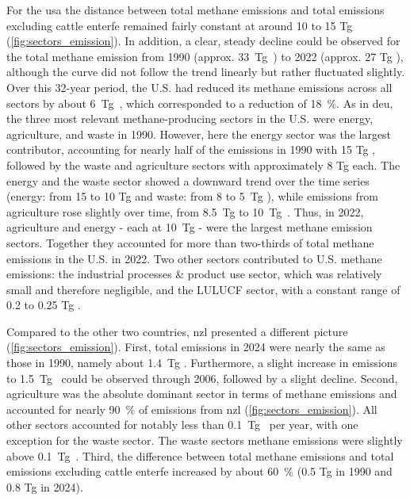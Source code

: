 For the \acrshort{usa} the distance between total methane emissions and total emissions excluding cattle \acrshort{enterfe} remained fairly constant at around 10 to 15 Tg  (\cref{fig:sectors_emission}).
In addition, a clear, steady decline could be observed for the total methane emission from 1990 (approx. 33~Tg~) to 2022 (approx. 27 Tg ), although the curve did not follow the trend linearly but rather fluctuated slightly. Over this 32-year period, the U.S. had reduced its methane emissions across all sectors by about 6~Tg~, which corresponded to a reduction of 18~\%.
As in \acrshort{deu}, the three most relevant methane-producing sectors in the U.S. were energy, agriculture, and waste in 1990. However, here the energy sector was the largest contributor, accounting for nearly half of the emissions in 1990 with 15 Tg , followed by the waste and agriculture sectors with approximately 8 Tg  each.
The energy and the waste sector showed a downward trend over the time series (energy: from 15 to 10 Tg  and waste: from 8 to 5~Tg ), while emissions from agriculture rose slightly over time, from 8.5~Tg to 10~Tg~. Thus, in 2022, agriculture and energy - each at 10~Tg  - were the largest methane emission sectors. Together they accounted for more than two-thirds of total methane emissions in the U.S. in 2022.
Two other sectors contributed to U.S. methane emissions: the industrial processes \& product use sector, which was relatively small and therefore negligible, and the LULUCF sector, with a constant range of 0.2 to 0.25 Tg .

Compared to the other two countries, \acrshort{nzl} presented a different picture (\cref{fig:sectors_emission}).
First, total  emissions in 2024 were nearly the same as those in 1990, namely about 1.4~Tg . Furthermore, a slight increase in emissions to 1.5~Tg~ could be observed through 2006, followed by a slight decline.
Second, agriculture was the absolute dominant sector in terms of methane emissions and accounted for nearly 90~\% of  emissions from \acrshort{nzl} (\cref{fig:sectors_emission}). All other sectors accounted for notably less than 0.1~Tg~ per year, with one exception for the waste sector. The waste sectors methane emissions were slightly above 0.1~Tg~.
Third, the difference between total methane emissions and total emissions excluding cattle \acrshort{enterfe} increased by about 60~\% (0.5 Tg  in 1990 and 0.8 Tg in 2024).

